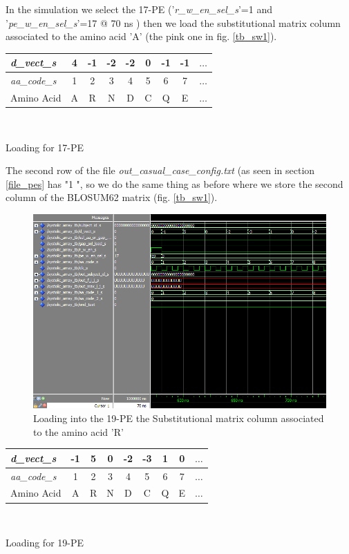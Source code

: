 In the simulation we select the 17-PE ('\textit{r\_w\_en\_sel\_s}'=1 and '\textit{pe\_w\_en\_sel\_s}'=17 @ 70 ns ) then we load the substitutional matrix column associated to the amino acid 'A' (the pink one in fig. \ref{tb_sw1}).\\
\begin{center}
	
\begin{tabular}{|l|c|c|c|c|c|c|c|c|}

	\hline
	\textit{d\_vect\_s} & 4 & -1 & -2 & -2& 0 & -1 & -1& $ \dots $\\
	\hline
	\textit{aa\_code\_s} & 1& 2& 3 &4 &5& 6& 7 & $ \dots $\\
	\hline
	Amino Acid & A& R& N &D &C& Q& E & $ \dots $\\
	\hline
\end{tabular}\\ 
\end{center}
\begin{center}
	Loading for 17-PE
\end{center}\clearpage
The second row of the file \textit{out\_casual\_case\_config.txt} (as seen in section \ref{file_pes} has "1 ", so we do the same thing as before where we store the second column of the BLOSUM62 matrix (fig. \ref{tb_sw1}).\begin{figure}[h!]
	\centering
	\includegraphics[width=\textwidth]{imm/sw/load_pe19.png}
	\caption{Loading into the 19-PE the Substitutional matrix column associated to the amino acid 'R'} 
	\label{tb_load_19}
\end{figure}
\begin{center}
	
\begin{tabular}{|l|c|c|c|c|c|c|c|c|}
	
	\hline
	\textit{d\_vect\_s} & -1 & 5 & 0 & -2& -3 & 1 & 0& $ \dots $\\
	\hline
	\textit{aa\_code\_s} & 1& 2& 3 &4 &5& 6& 7 & $ \dots $\\
	\hline
	Amino Acid & A& R& N &D &C& Q& E & $ \dots $\\
	\hline
\end{tabular}\\
\end{center}\begin{center}
Loading for 19-PE
\end{center}\clearpage
